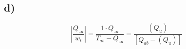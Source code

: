 

\subsection*{d)}

\[
\left| \frac{Q_{zu}}{w_t} \right| = \frac{1 \cdot Q_{zu}}{T_{ab} - Q_{zu}} = \frac{(Q_{u})}{[Q_{ab} - (Q_{u})]}
\]